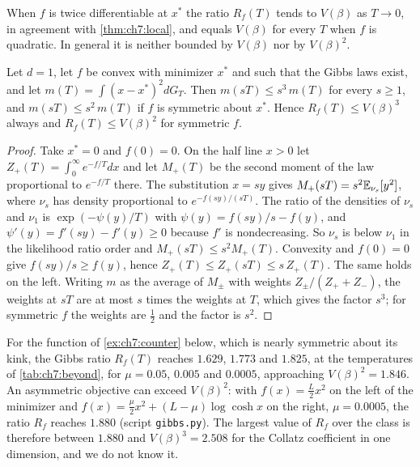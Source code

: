 When $f$ is twice differentiable at $x^\ast$ the ratio $R_f(T)$ tends to $V(\beta)$ as $T\to0$, in agreement with \cref{thm:ch7:local}, and equals $V(\beta)$ for every $T$ when $f$ is quadratic. In general it is neither bounded by $V(\beta)$ nor by $V(\beta)^2$.

\begin{proposition}\label{prop:ch7:onedim}
Let $d=1$, let $f$ be convex with minimizer $x^\ast$ and such that the Gibbs laws exist, and let $m(T)=\int(x-x^\ast)^2dG_T$. Then $m(sT)\le s^3\,m(T)$ for every $s\ge1$, and $m(sT)\le s^2\,m(T)$ if $f$ is symmetric about $x^\ast$. Hence $R_f(T)\le V(\beta)^3$ always and $R_f(T)\le V(\beta)^2$ for symmetric $f$.
\end{proposition}

\begin{proof}
Take $x^\ast=0$ and $f(0)=0$. On the half line $x>0$ let $Z_+(T)=\int_0^\infty e^{-f/T}dx$ and let $M_+(T)$ be the second moment of the law proportional to $e^{-f/T}$ there. The substitution $x=sy$ gives $M_+(sT)=s^2\mathbb{E}_{\nu_s}[y^2]$, where $\nu_s$ has density proportional to $e^{-f(sy)/(sT)}$. The ratio of the densities of $\nu_s$ and $\nu_1$ is $\exp(-\psi(y)/T)$ with $\psi(y)=f(sy)/s-f(y)$, and $\psi'(y)=f'(sy)-f'(y)\ge0$ because $f'$ is nondecreasing. So $\nu_s$ is below $\nu_1$ in the likelihood ratio order and $M_+(sT)\le s^2M_+(T)$. Convexity and $f(0)=0$ give $f(sy)/s\ge f(y)$, hence $Z_+(T)\le Z_+(sT)\le s\,Z_+(T)$. The same holds on the left. Writing $m$ as the average of $M_\pm$ with weights $Z_\pm/(Z_++Z_-)$, the weights at $sT$ are at most $s$ times the weights at $T$, which gives the factor $s^3$; for symmetric $f$ the weights are $\tfrac12$ and the factor is $s^2$.
\end{proof}

For the function of \cref{ex:ch7:counter} below, which is nearly symmetric about its kink, the Gibbs ratio $R_f(T)$ reaches $1.629$, $1.773$ and $1.825$, at the temperatures of \cref{tab:ch7:beyond}, for $\mu=0.05$, $0.005$ and $0.0005$, approaching $V(\beta)^2=1.846$. An asymmetric objective can exceed $V(\beta)^2$: with $f(x)=\tfrac L2x^2$ on the left of the minimizer and $f(x)=\tfrac\mu2x^2+(L-\mu)\log\cosh x$ on the right, $\mu=0.0005$, the ratio $R_f$ reaches $1.880$ (script \texttt{gibbs.py}). The largest value of $R_f$ over the class is therefore between $1.880$ and $V(\beta)^3=2.508$ for the Collatz coefficient in one dimension, and we do not know it.

